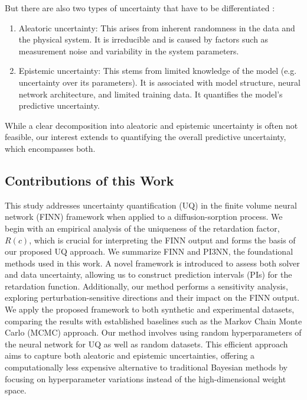 \documentclass{article}
\begin{document}
But there are also two types of uncertainty that have to be differentiated \cite{depeweg2018decomposition, gawlikowski2023survey}:

\begin{enumerate}
    \item Aleatoric uncertainty: This arises from inherent randomness in the data and the physical system. It is irreducible and is caused by factors such as measurement noise and variability in the system parameters.
    \item Epistemic uncertainty: This stems from limited knowledge of the model (e.g. uncertainty over its parameters). It is associated with model structure, neural network architecture, and limited training data. It quantifies the model's predictive uncertainty.
\end{enumerate}

While a clear decomposition into aleatoric and epistemic uncertainty is often not feasible, our interest extends to quantifying the overall predictive uncertainty, which encompasses both.


\subsection{Contributions of this Work}
This study addresses uncertainty quantification (UQ) in the finite volume neural network (FINN) framework when applied to a diffusion-sorption process. We begin with an empirical analysis of the uniqueness of the retardation factor, $R(c)$, which is crucial for interpreting the FINN output and forms the basis of our proposed UQ approach. We summarize FINN and PI3NN, the foundational methods used in this work. A novel framework is introduced to assess both solver and data uncertainty, allowing us to construct prediction intervals (PIs) for the retardation function. Additionally, our method performs a sensitivity analysis, exploring perturbation-sensitive directions and their impact on the FINN output. We apply the proposed framework to both synthetic and experimental datasets, comparing the results with established baselines such as the Markov Chain Monte Carlo (MCMC) approach. Our method involves using random hyperparameters of the neural network for UQ as well as random datasets. This efficient approach aims to capture both aleatoric and epistemic uncertainties, offering a computationally less expensive alternative to traditional Bayesian methods by focusing on hyperparameter variations instead of the high-dimensional weight space. %
\end{document}
